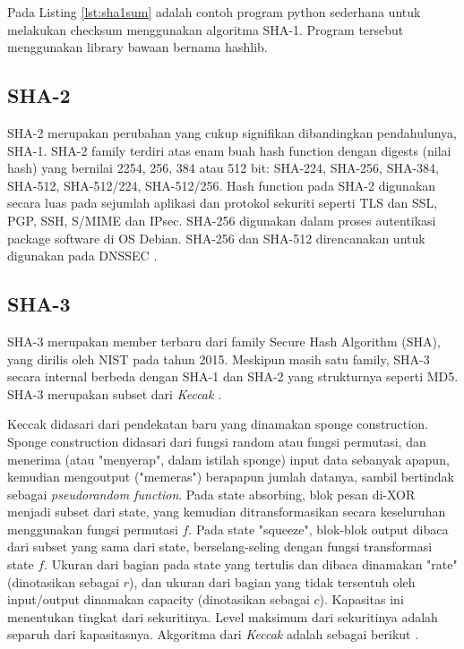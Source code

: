 

Pada Listing \ref{lst:sha1sum} adalah contoh program python sederhana untuk melakukan checksum menggunakan algoritma SHA-1. Program tersebut menggunakan library bawaan bernama hashlib.

\subsection{SHA-2}
\label{subsec:SHA2}

SHA-2 merupakan perubahan yang cukup signifikan dibandingkan pendahulunya, SHA-1. SHA-2 family terdiri atas enam buah hash function dengan digests (nilai hash) yang bernilai 2254, 256, 384 atau 512 bit: SHA-224, SHA-256, SHA-384, SHA-512, SHA-512/224, SHA-512/256. Hash function pada SHA-2 digunakan secara luas pada sejumlah aplikasi dan protokol sekuriti seperti TLS dan SSL, PGP, SSH, S/MIME dan IPsec. SHA-256 digunakan dalam proses autentikasi package software di OS Debian. SHA-256 dan SHA-512 direncanakan untuk digunakan pada DNSSEC \citep{rfc5702}.

\subsection{SHA-3}
\label{subsec:SHA3}

SHA-3 merupakan member terbaru dari family Secure Hash Algorithm (SHA), yang dirilis oleh NIST pada tahun 2015. Meskipun masih satu family, SHA-3 secara internal berbeda dengan SHA-1 dan SHA-2 yang strukturnya seperti MD5. SHA-3 merupakan subset dari \emph{Keccak} \citep{nist2012}. 

Keccak didasari dari pendekatan baru yang dinamakan sponge construction. Sponge construction didasari dari fungsi random atau fungsi permutasi, dan menerima (atau "menyerap", dalam istilah sponge) input data sebanyak apapun, kemudian mengoutput ("memeras") berapapun jumlah datanya, sambil bertindak sebagai \emph{pseudorandom function}. Pada state absorbing, blok pesan di-XOR menjadi subset dari state, yang kemudian ditransformasikan secara keseluruhan menggunakan fungsi permutasi \(f\). Pada state "squeeze", blok-blok output dibaca dari subset yang sama dari state, berselang-seling dengan fungsi transformasi state \(f\). Ukuran dari bagian pada state yang tertulis dan dibaca dinamakan "rate" (dinotasikan sebagai \(r\)), dan ukuran dari bagian yang tidak tersentuh oleh input/output dinamakan capacity (dinotasikan sebagai \(c\)). Kapasitas ini menentukan tingkat dari sekuritinya. Level maksimum dari sekuritinya adalah separuh dari kapasitasnya. Akgoritma dari \emph{Keccak} adalah sebagai berikut \citep{arshad2014}.

